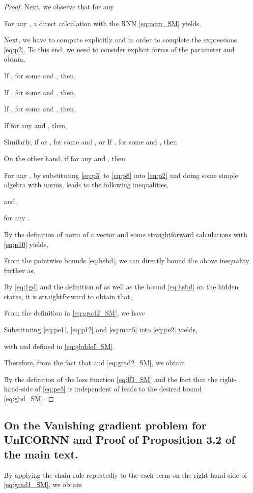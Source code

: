 \documentclass{article}
\begin{document}
\begin{proof}
Next, we observe that for any 

For any , a direct calculation with the RNN \eqref{eq:ucrn_SM} yields,

Next, we have to compute explicitly  and  in order to complete the expressions \eqref{eq:p2}. To this end, we need to consider explicit forms of the parameter  and obtain, 

If , for some  and , then,


If , for some  and , then,


If , for some  and , then,

If for any  and , then,


Similarly, if  or , for some  and , or If , for some  and , then

On the other hand, if for any  and , then

For any , by substituting \eqref{eq:p3} to \eqref{eq:p8} into \eqref{eq:p2} and doing some simple algebra with norms, leads to the following inequalities,

and,

for any .

By the definition of  norm of a vector and some straightforward calculations with \eqref{eq:p10} yields,

From the pointwise bounds \eqref{eq:hsbd}, we can directly bound the above inequality further as,


By \eqref{eq:1gd} and the definition of  as well as the bound \eqref{eq:hsbd} on the hidden states, it is straightforward to obtain that,

From the definition in \eqref{eq:grad2_SM}, we have

Substituting \eqref{eq:pe1}, \eqref{eq:p12} and \eqref{eq:mat5} into \eqref{eq:pe2} yields,

with  and  defined in \eqref{eq:gbddef_SM}.

Therefore, from the fact that  and \eqref{eq:grad2_SM}, we obtain

By the definition of the loss function \eqref{eq:lf1_SM} and the fact that the right-hand-side of \eqref{eq:pe5} is independent of  leads to the desired bound \eqref{eq:gbd_SM}. 







\end{proof}
\subsection{On the Vanishing gradient problem for UnICORNN and Proof of Proposition 3.2 of the main text.}
By applying the chain rule repeatedly to the each term on the right-hand-side of \eqref{eq:grad1_SM}, we obtain 
\end{document}
